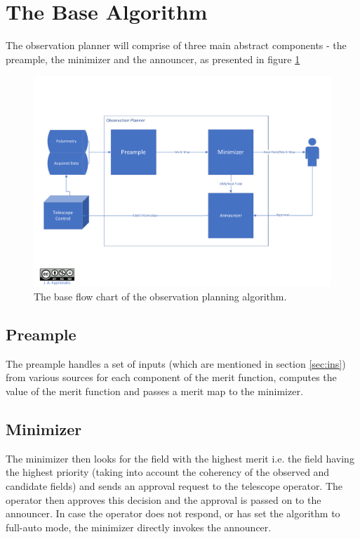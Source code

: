 \documentclass{article}
\begin{document}
\clearpage
\section{The Base Algorithm}
The observation planner will comprise of three main abstract components - the preample, the minimizer and the announcer, as presented in figure \ref{fig:baseflow}
\begin{figure}[!ht]
\centering
\includegraphics[width=\linewidth]{Base_new.pdf}
\caption{The base flow chart of the observation planning algorithm.}
\label{fig:baseflow}
\end{figure}

\subsection{Preample}
The preample handles a set of inputs (which are mentioned in section \ref{sec:ins}) from various sources for each component of the merit function, computes the value of the merit function and passes a merit map to the minimizer.

\subsection{Minimizer}
The minimizer then looks for the field with the highest merit i.e. the field having the highest priority (taking into account the coherency of the observed and candidate fields) and sends an approval request to the telescope operator. The operator then approves this decision and the approval is passed on to the announcer. In case the operator does not respond, or has set the algorithm to full-auto mode, the minimizer directly invokes the announcer. 
\end{document}
